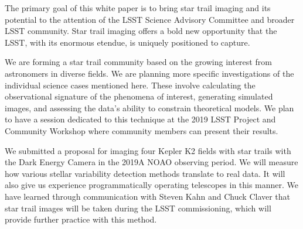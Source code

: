 \documentclass[12pt, letterpaper]{article}
\begin{document}
The primary goal of this white paper is to bring star trail imaging and its potential to the attention of the LSST Science Advisory Committee and broader LSST community. Star trail imaging offers a bold new opportunity that the LSST, with its enormous etendue, is uniquely positioned to capture. 

We are forming a star trail community based on the growing interest from astronomers in diverse fields. We are planning more specific investigations of the individual science cases mentioned here. These involve calculating the observational signature of the phenomena of interest, generating simulated images, and assessing the data's ability to constrain theoretical models. We plan to have a session dedicated to this technique at the 2019 LSST Project and Community Workshop where community members can present their results.

We submitted a proposal for imaging four Kepler K2 fields with star trails with the Dark Energy Camera in the 2019A NOAO observing period. We will measure how various stellar variability detection methods translate to real data. It will also give us experience programmatically operating telescopes in this manner. We have learned through communication with Steven Kahn and Chuck Claver that star trail images will be taken during the LSST commissioning, which will provide further practice with this method. 



\end{document}
